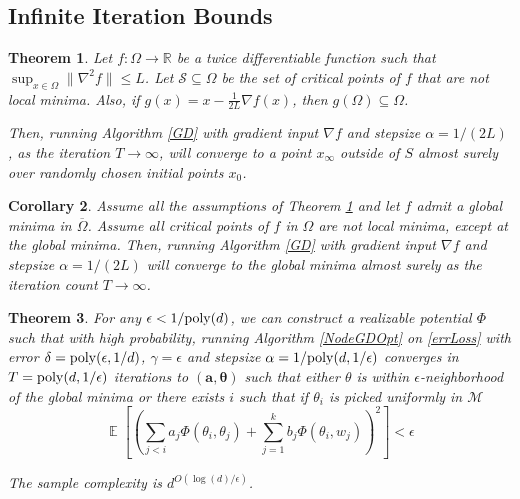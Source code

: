 \documentclass{article}
\newtheorem{theorem}{Theorem}[section]
\newtheorem{corollary}[theorem]{Corollary}
\newcommand{\R}{{\mathbb{R}}}
\DeclareMathOperator*{\expt}{\mathbb{E}}
\begin{document}

\subsection{Infinite Iteration Bounds} 
\label{InfIter}


\begin{theorem}\cite{lee2016gradient, PanageasP16}\label{convStrict}
  Let $f :\Omega \to \R$ be a twice differentiable function such that
  $\sup_{x \in \Omega} \|\nabla^2 f\| \leq L$. Let
  $\mathcal{S} \subseteq \Omega$ be the set of critical points of $f$
  that are not local minima. Also, if
  $g(x) = x - \frac{1}{2L} \nabla f(x)$, then
  $g(\Omega) \subseteq \Omega$.

  Then, running Algorithm \ref{GD} with gradient input $\nabla f$ and
  stepsize $\alpha = 1/(2L)$, as the iteration $T \to\infty$, will
  converge to a point $x_\infty$ outside of $S$ almost surely over
  randomly chosen initial points $x_0$.
\end{theorem}

\begin{corollary}
Assume all the assumptions of Theorem \ref{convStrict} and let $f$ admit a global minima in $\overline{\Omega}$. Assume all critical points of $f$ in $\Omega$ are not local minima, except at the global minima. Then, running Algorithm \ref{GD} with gradient input $\nabla f$ and stepsize $\alpha = 1/(2L)$ will converge to the global minima almost surely as the iteration count $T \to\infty$.
\end{corollary}
\fi


\begin{theorem}
For any $\epsilon < 1/\mathrm{poly}(d)$, we can construct a realizable potential $\Phi$ such that with high probability, running Algorithm \ref{NodeGDOpt} on \eqref{errLoss} with error $\delta = \mathrm{poly}(\epsilon,1/d)$, $\gamma = \epsilon$ and stepsize $\alpha = 1/\mathrm{poly}(d,1/\epsilon)$ converges in $T = \mathrm{poly}(d, 1/\epsilon)$ iterations to $(\boldsymbol{a,\theta})$ such that either  $\theta$ is within $\epsilon$-neighborhood of the global minima or there exists $i$ such that if $\theta_i$ is picked uniformly in $\mathcal{M}$
%
\[ \expt\left[\left( \sum_{j < i} a_j \Phi(\theta_i,\theta_j) + \sum_{j=1}^k b_j \Phi(\theta_i,w_j)\right)^2\right] < \epsilon\]

The sample complexity is $d^{O(\log(d)/\epsilon)}$.
\end{theorem}
\end{document}
